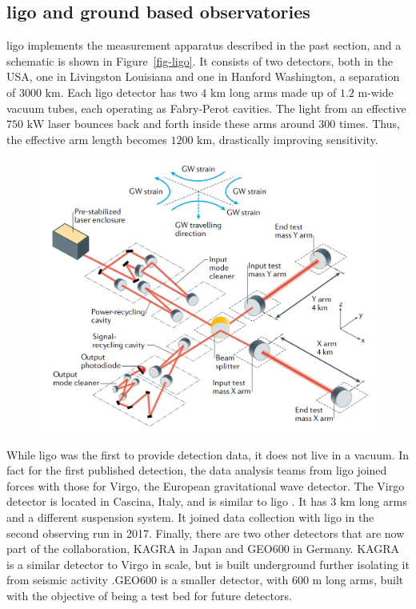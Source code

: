 \documentclass[
  11pt,
  a4paper,
  DIV=11,
  numbers=noendperiod,
  oneside]{scrreprt}
\DeclareRobustCommand{\[}{\begin{equation}}
\DeclareRobustCommand{\]}{\end{equation}}
\begin{document}
\hypertarget{sec-ligo}{%
\subsection{\texorpdfstring{\gls{ligo} and ground based
observatories}{ and ground based observatories}}\label{sec-ligo}}

\gls{ligo} implements the measurement apparatus described in the past
section, and a schematic is shown in Figure~\ref{fig-ligo}. It consists
of two detectors, both in the USA, one in Livingston Louisiana and one
in Hanford Washington, a separation of \(3000 \text{ km}\). Each
\gls{ligo} detector has two \(4\text{ km}\) long arms made up of
\(1.2\text{ m}\)-wide vacuum tubes, each operating as Fabry-Perot
cavities. The light from an effective \(750\text{ kW}\) laser bounces
back and forth inside these arms around 300 times. Thus, the effective
arm length becomes \(1200\text{ km}\), drastically improving
sensitivity.

\begin{figure}


{\centering \includegraphics{./ligoconcepttrans.png}

}

\end{figure}

While \gls{ligo} was the first to provide detection data, it does not
live in a vacuum. In fact for the first published detection, the data
analysis teams from \gls{ligo} joined forces with those for Virgo, the
European gravitational wave detector. The Virgo detector is located in
Cascina, Italy, and is similar to \gls{ligo} . It has \(3\text{ km}\)
long arms and a different suspension system. It joined data collection
with \gls{ligo} in the second observing run in 2017. Finally, there are
two other detectors that are now part of the collaboration, KAGRA in
Japan and GEO600 in Germany. KAGRA is a similar detector to Virgo in
scale, but is built underground further isolating it from seismic
activity .GEO600 is a smaller detector, with \(600 \text{ m}\) long
arms, built with the objective of being a test bed for future detectors.
\end{document}
